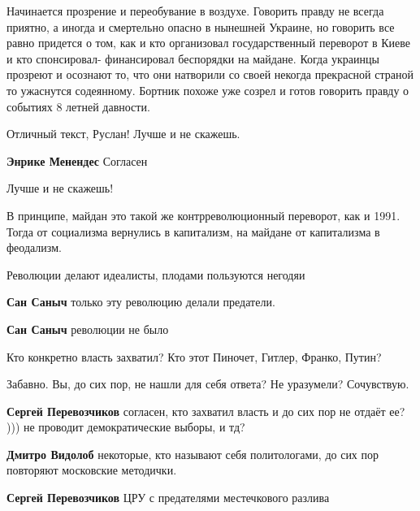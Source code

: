 \begin{itemize}
Начинается прозрение и переобувание в воздухе. Говорить правду не всегда
приятно, а иногда и смертельно опасно в нынешней Украине, но говорить все равно
придется о том, как и кто организовал государственный переворот в Киеве и кто
спонсировал- финансировал беспорядки на майдане. Когда украинцы прозреют и
осознают то, что они натворили со своей некогда прекрасной страной то ужаснутся
содеянному. Бортник похоже уже созрел и готов говорить правду о событиях 8
летней давности.


Отличный текст, Руслан! Лучше и не скажешь.

\begin{itemize} %
\textbf{Энрике Менендес} Согласен
\end{itemize} %

Лучше и не скажешь!


В принципе, майдан это такой же контрреволюционный переворот, как и 1991. Тогда
от социализма вернулись в капитализм, на майдане от капитализма в феодализм.


Революции делают идеалисты, плодами пользуются негодяи

\begin{itemize} %
\textbf{Сан Саныч} только эту революцию делали предатели.

\textbf{Сан Саныч} революции не было
\end{itemize} %

Кто конкретно власть захватил? Кто этот Пиночет, Гитлер, Франко, Путин?

\begin{itemize} %
Забавно. Вы, до сих пор, не нашли для себя ответа? Не уразумели? Сочувствую.

\textbf{Сергей Перевозчиков} согласен, кто захватил власть и до сих пор не отдаёт ее? ))) не проводит демократические выборы, и тд?

\textbf{Дмитро Видолоб} некоторые, кто называют себя политологами, до сих пор повторяют московские методички.

\textbf{Сергей Перевозчиков} ЦРУ с предателями местечкового разлива



\end{itemize}
\end{itemize}
